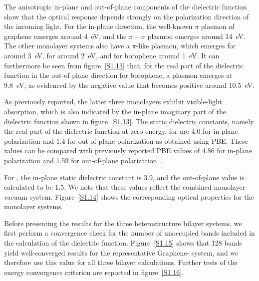 The anisotropic in-plane and out-of-plane components of the dielectric function show that the optical response depends strongly on the polarization direction of the incoming light.
For the in-plane direction, the well-known $\pi$ plasmon of graphene emerges around \qty{4}{\electronvolt},
and the $\pi-\sigma$ plasmon emerges around \qty{14}{\electronvolt}.
The other monolayer systems also have a $\pi$-like plasmon,
which emerges for  around \qty{3}{\electronvolt},
for  around \qty{2}{\electronvolt},
and for borophene around \qty{1}{\electronvolt}.
It can furthermore be seen from figure~\ref{S1.13} that, for the real part of the dielectric function in the out-of-plane direction for borophene,
a plasmon emerges at \qty{9.8}{\electronvolt}, as evidenced by the negative value that becomes positive around \qty{10.5}{\electronvolt}.

As previously reported, the latter three monolayers exhibit visible-light absorption,
which is also indicated by the in-plane imaginary part of the dielectric function shown in figure~\ref{S1.13}.
The static dielectric constants, namely the real part of the dielectric function at zero energy,
for  are 4.0 for in-plane polarization and 1.4 for out-of-plane polarization as obtained using PBE.
These values can be compared with previously reported PBE values of 4.86 for in-plane polarization and 1.59 for out-of-plane polarization~\cite{mortazavi2019outstanding}.

For , the in-plane static dielectric constant is 3.9,
and the out-of-plane value is calculated to be 1.5.
We note that these values reflect the combined monolayer-vacuum system.
Figure~\ref{S1.14} shows the corresponding optical properties for the monolayer systems.

Before presenting the results for the three heterostructure bilayer systems,
we first perform a convergence check for the number of unoccupied bands included in the calculation of the dielectric function.
Figure~\ref{S1.15} shows that 128 bands yield well-converged results for the representative Graphene- system,
and we therefore use this value for all three bilayer calculations.
Further tests of the energy convergence criterion are reported in figure~\ref{S1.16}.

